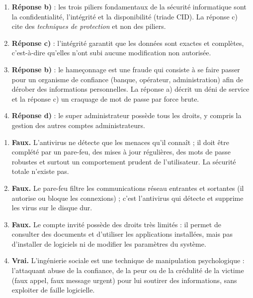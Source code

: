 \documentclass[11pt]{article}
\newcommand{\cle}[1]{{\popxbold\color{popdark}#1}}
\begin{document}
\begin{corrige}
\begin{enumerate}
\item \textbf{Réponse b)} : les trois piliers fondamentaux de la sécurité informatique sont la \cle{confidentialité}, l'\cle{intégrité} et la \cle{disponibilité} (triade CID). La réponse c) cite des \emph{techniques de protection} et non des piliers.
\item \textbf{Réponse c)} : l'\cle{intégrité} garantit que les données sont exactes et complètes, c'est-à-dire qu'elles n'ont subi aucune modification non autorisée.
\item \textbf{Réponse b)} : le hameçonnage est une fraude qui consiste à se faire passer pour un organisme de confiance (banque, opérateur, administration) afin de dérober des informations personnelles. La réponse a) décrit un déni de service et la réponse c) un craquage de mot de passe par force brute.
\item \textbf{Réponse d)} : le \cle{super administrateur} possède tous les droits, y compris la gestion des autres comptes administrateurs.
\end{enumerate}
\end{corrige}

\begin{corrige}
\begin{enumerate}
\item \textbf{Faux.} L'antivirus ne détecte que les menaces qu'il connaît ; il doit être complété par un pare-feu, des mises à jour régulières, des mots de passe robustes et surtout un comportement prudent de l'utilisateur. La sécurité totale n'existe pas.
\item \textbf{Faux.} Le pare-feu filtre les communications réseau entrantes et sortantes (il autorise ou bloque les connexions) ; c'est l'antivirus qui détecte et supprime les virus sur le disque dur.
\item \textbf{Faux.} Le compte invité possède des droits très limités : il permet de consulter des documents et d'utiliser les applications installées, mais pas d'installer de logiciels ni de modifier les paramètres du système.
\item \textbf{Vrai.} L'ingénierie sociale est une technique de manipulation psychologique : l'attaquant abuse de la confiance, de la peur ou de la crédulité de la victime (faux appel, faux message urgent) pour lui soutirer des informations, sans exploiter de faille logicielle.
\end{enumerate}
\end{corrige}
\end{document}
